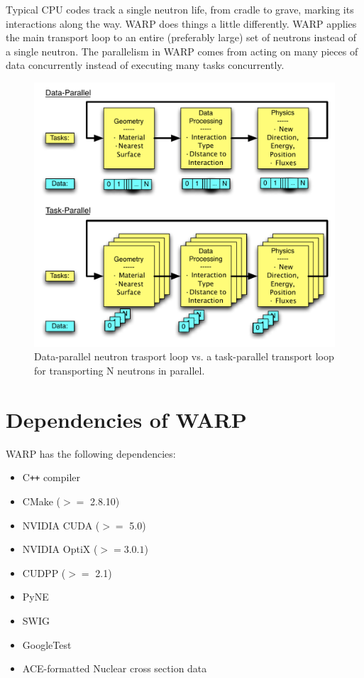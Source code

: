\documentclass[twoside,a4paper]{refart}
\begin{document}
Typical CPU codes track a single neutron life, from cradle to grave, marking its interactions along the way.  WARP does things a little differently.  WARP applies the main transport loop to an entire (preferably large) set of neutrons instead of a single neutron.  The parallelism in WARP comes from acting on many pieces of data concurrently instead of executing many tasks concurrently.


\begin{figure}[h!] 
  \centering
    \includegraphics[width=\textwidth]{graphics/datavtask.pdf}
     \caption{Data-parallel neutron trasport loop vs. a task-parallel transport loop for transporting N neutrons in parallel.  \label{datavtask} }
\end{figure}

\section{Dependencies of WARP}

WARP has the following dependencies:
\begin{itemize}
	\item{C\texttt{++} compiler}
	\item{CMake ($>=$ 2.8.10)}
	\item{NVIDIA CUDA ($>=$ 5.0)}
	\item{NVIDIA OptiX ($>= 3.0.1$)}
	\item{CUDPP ($>=$ 2.1)}
	\item{PyNE}
	\item{SWIG}
	\item{GoogleTest}
	\item{ACE-formatted Nuclear cross section data}
\end{itemize}
\end{document}
